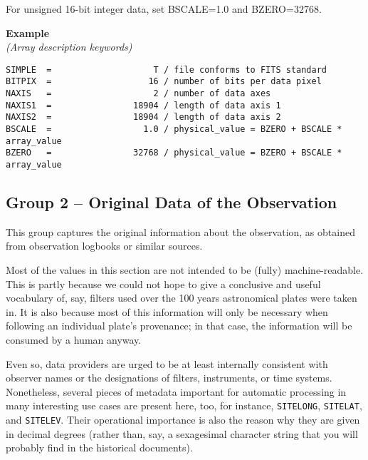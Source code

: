 \documentclass[11pt]{ivoa}
\newcommand\cardname[1]{\texttt{\color{keyword}#1}}
\newenvironment{fitsexample}[1]
{\bigskip\noindent\textbf{Example}\\\textit{(#1\smallskip)}}
{\medskip}
\begin{document}
For unsigned 16-bit integer data, set BSCALE=1.0 and BZERO=32768.

\begin{fitsexample}{Array description keywords}
\begin{lstlisting}
SIMPLE  =                    T / file conforms to FITS standard
BITPIX  =                   16 / number of bits per data pixel
NAXIS   =                    2 / number of data axes
NAXIS1  =                18904 / length of data axis 1
NAXIS2  =                18904 / length of data axis 2
BSCALE  =                  1.0 / physical_value = BZERO + BSCALE * array_value
BZERO   =                32768 / physical_value = BZERO + BSCALE * array_value
\end{lstlisting}
\end{fitsexample}

\subsection{Group 2 -- Original Data of the Observation}

This group captures the original information about
the observation, as obtained from observation logbooks or similar
sources.

Most of the values in this section are not intended to be (fully)
machine-readable.  This is partly because we could not hope to give a
conclusive and useful vocabulary of, say, filters used over the 100 years
astronomical plates were taken in.  It is also because most of
this information will only be necessary when following an individual
plate's provenance; in that case, the information will be consumed by a
human anyway.

Even so, data providers are urged to be at least internally consistent
with observer names or the designations of filters, instruments, or time
systems.  Nonetheless, several pieces of metadata important for automatic
processing in many interesting use cases are present here, too, for
instance, \cardname{SITELONG}, \cardname{SITELAT}, and
\cardname{SITELEV}.  Their operational importance is also
the reason why they are given in decimal degrees (rather than, say, a
sexagesimal character string that you will probably find in the
historical documents).
\end{document}
